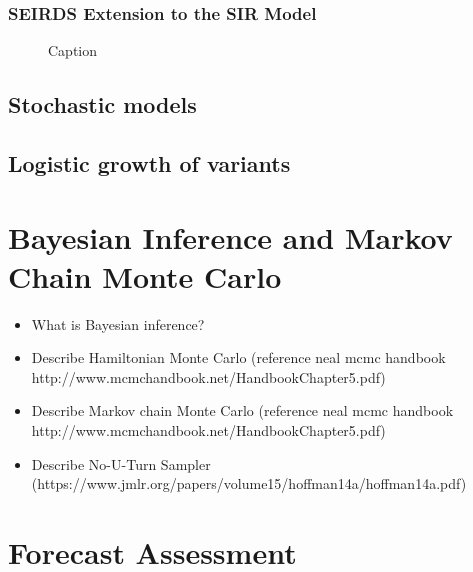 \subsubsection{SEIRDS Extension to the SIR Model}

\begin{figure}
    \centering
    \caption{Caption}
    \label{fig:SEIRDS_diagram}
\end{figure}

\subsection{Stochastic models}


\subsection{Logistic growth of variants}


\section{Bayesian Inference and Markov Chain Monte Carlo}
\label{sec:bayesian-mcmc}
\begin{itemize}
    \item What is Bayesian inference?
    \item Describe Hamiltonian Monte Carlo (reference neal mcmc handbook http://www.mcmchandbook.net/HandbookChapter5.pdf)
    \item Describe Markov chain Monte Carlo (reference neal mcmc handbook http://www.mcmchandbook.net/HandbookChapter5.pdf) 
    \item Describe No-U-Turn Sampler (https://www.jmlr.org/papers/volume15/hoffman14a/hoffman14a.pdf)
\end{itemize}

\section{Forecast Assessment}
\label{sec:forecasting_techniques_and_assessment}

